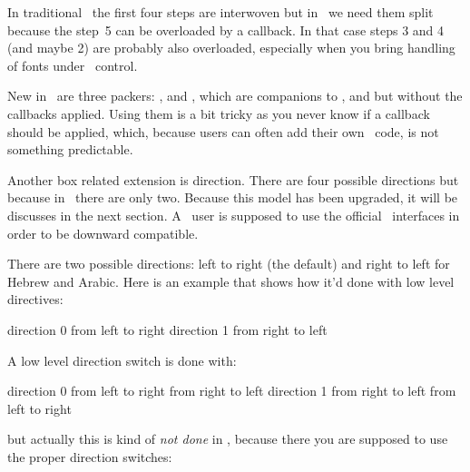 In traditional \TEX\ the first four steps are interwoven but in \LUATEX\ we need
them split because the step~5 can be overloaded by a callback. In that case steps
3 and 4 (and maybe 2) are probably also overloaded, especially when you bring
handling of fonts under \LUA\ control.

New in \LUATEX\ are three packers: \type {\hpack}, \type {\vpack} and \type
{\tpack}, which are companions to \type {\hbox}, \type {\vbox} and \type {\vtop}
but without the callbacks applied. Using them is a bit tricky as you never know
if a callback should be applied, which, because users can often add their own
\LUA\ code, is not something predictable.

Another box related extension is direction. There are four possible directions
but because in \LUAMETATEX\ there are only two. Because this model has been upgraded,
it will be discusses in the next section. A \CONTEXT\ user is supposed to use the
official \CONTEXT\ interfaces in order to be downward compatible.

\stopsectionlevel

\startsectionlevel[title={\LUAMETATEX\ primitives}]

There are two possible directions: left to right (the default) and right to left
for Hebrew and Arabic. Here is an example that shows how it'd done with low level
directives:

\startbuffer
\hbox direction 0 {from left to right}
\hbox direction 1 {from right to left}
\stopbuffer

\typebuffer[option=TEX]

\startlinecorrection
\getbuffer
\stoplinecorrection

A low level direction switch is done with:

\startbuffer
\hbox direction 0
    {from left to right  from right to left}
\hbox direction 1
    {from right to left  from left to right}
\stopbuffer

\typebuffer[option=TEX]

\startlinecorrection
\getbuffer
\stoplinecorrection

but actually this is kind of {\em not done} in \CONTEXT, because there you are
supposed to use the proper direction switches:

\startbuffer
{}
\stopbuffer


